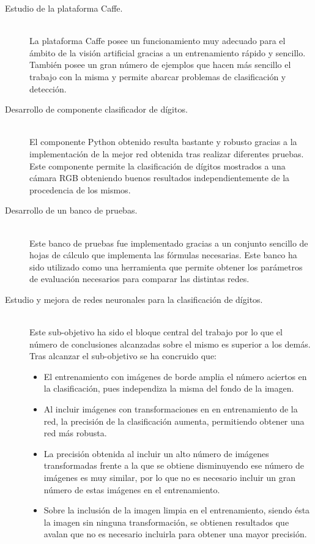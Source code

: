 \begin{description}
	\item[Estudio de la plataforma Caffe.] \hfill 
	\vspace{5pt}
	\\
	La plataforma Caffe posee un funcionamiento muy adecuado para el ámbito de la visión artificial gracias a un entrenamiento rápido y sencillo. También posee un gran número de ejemplos que hacen más sencillo el trabajo con la misma y permite abarcar problemas de clasificación y detección.
	\item[Desarrollo de componente clasificador de dígitos.] \hfill 
	\vspace{5pt}
	\\
	El componente Python obtenido resulta bastante y robusto gracias a la implementación de la mejor red obtenida tras realizar diferentes pruebas. Este componente permite la clasificación de dígitos mostrados a una cámara RGB obteniendo buenos resultados independientemente de la procedencia de los mismos.\\
	\item[Desarrollo de un banco de pruebas.] \hfill 
	\vspace{5pt}
	\\
	Este banco de pruebas fue implementado gracias a un conjunto sencillo de hojas de cálculo que implementa las fórmulas necesarias. Este banco ha sido utilizado como una herramienta que permite obtener los parámetros de evaluación necesarios para comparar las distintas redes.
	\item[Estudio y mejora de redes neuronales para la clasificación de dígitos.] \hfill 
	\vspace{5pt}
	\\
	Este sub-objetivo ha sido el bloque central del trabajo por lo que el número de conclusiones alcanzadas sobre el mismo es superior a los demás. Tras alcanzar el sub-objetivo se ha concruido que:
	\begin{itemize}
		\item El entrenamiento con imágenes de borde amplia el número aciertos en la clasificación, pues independiza la misma del fondo de la imagen.
		\item Al incluir imágenes con transformaciones en en entrenamiento de la red, la precisión de la clasificación aumenta, permitiendo obtener una red más robusta.
		\item La precisión obtenida al incluir un alto número de imágenes transformadas frente a la que se obtiene disminuyendo ese número de imágenes es muy similar, por lo que no es necesario incluir un gran número de estas imágenes en el entrenamiento.
		\item Sobre la inclusión de la imagen limpia en el entrenamiento, siendo ésta la imagen sin ninguna transformación, se obtienen resultados que avalan que no es necesario incluirla para obtener una mayor precisión.
	\end{itemize}


\end{description}
